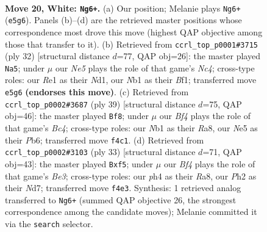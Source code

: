\documentclass[11pt]{article}
\begin{document}
\clearpage

\begin{figure}[p]\centering
\begin{subfigure}{0.46\textwidth}\centering
\resizebox{\linewidth}{!}{%
\newchessgame
\chessboard[
  setfen={rn1r1k2/6b1/2p1p3/4N1p1/p3nB1p/P7/RPP2PPP/1N2RK2 w - - 0 20},
  showmover=false,
  pgfstyle=straightmove, color=movearrow, markmove={e5-g6}
]}
\caption{}
\end{subfigure}\hfill
\begin{subfigure}{0.46\textwidth}\centering
\resizebox{\linewidth}{!}{%
\newchessgame
\chessboard[
  setfen={rn1r2k1/p4ppp/b4n2/2p5/PpN1P3/2P2P2/6PP/R2NKB1R w KQ - 0 17},
  showmover=false,
  pgfstyle=straightmove, color=movearrow, markmove={c4-a5}
]}
\caption{}
\end{subfigure}
\\[4pt]
\begin{subfigure}{0.46\textwidth}\centering
\resizebox{\linewidth}{!}{%
\newchessgame
\chessboard[
  setfen={r3r1k1/p4ppp/1pn5/2bRPNB1/1PP5/P7/6PP/5R1K b - - 0 20},
  showmover=false,
  pgfstyle=straightmove, color=movearrow, markmove={c5-f8}
]}
\caption{}
\end{subfigure}\hfill
\begin{subfigure}{0.46\textwidth}\centering
\resizebox{\linewidth}{!}{%
\newchessgame
\chessboard[
  setfen={r6r/pk1n3p/1p2b1p1/2pN1P1n/2P5/1P6/P2K1PP1/3R1BNR b - - 0 17},
  showmover=false,
  pgfstyle=straightmove, color=movearrow, markmove={e6-f5}
]}
\caption{}
\end{subfigure}
\caption{\textbf{Move 20, White: \texttt{Ng6+}.} (a) Our position; Melanie plays \texttt{Ng6+} (\texttt{e5g6}). Panels (b)--(d) are the retrieved master positions whose correspondence most drove this move (highest QAP objective among those that transfer to it). (b) Retrieved from \texttt{ccrl\_top\_p0001\#3715} (ply 32) [structural distance $d$=77, QAP obj=26]: the master played \texttt{Na5}; under $\mu$ our \emph{Ne5} plays the role of that game's \emph{Nc4}; cross-type roles: our \emph{R}e1 as their \emph{N}d1, our \emph{N}b1 as their \emph{B}f1; transferred move \texttt{e5g6} \textbf{(endorses this move)}. (c) Retrieved from \texttt{ccrl\_top\_p0002\#3687} (ply 39) [structural distance $d$=75, QAP obj=46]: the master played \texttt{Bf8}; under $\mu$ our \emph{Bf4} plays the role of that game's \emph{Bc4}; cross-type roles: our \emph{N}b1 as their \emph{R}a8, our \emph{N}e5 as their \emph{P}b6; transferred move \texttt{f4c1}. (d) Retrieved from \texttt{ccrl\_top\_p0002\#3103} (ply 33) [structural distance $d$=71, QAP obj=43]: the master played \texttt{Bxf5}; under $\mu$ our \emph{Bf4} plays the role of that game's \emph{Be3}; cross-type roles: our \emph{p}h4 as their \emph{R}a8, our \emph{P}h2 as their \emph{N}d7; transferred move \texttt{f4e3}. Synthesis: 1 retrieved analog transferred to \texttt{Ng6+} (summed QAP objective 26, the strongest correspondence among the candidate moves); Melanie committed it via the \texttt{search} selector.}
\label{fig:thought-m38}
\end{figure}
\end{document}
